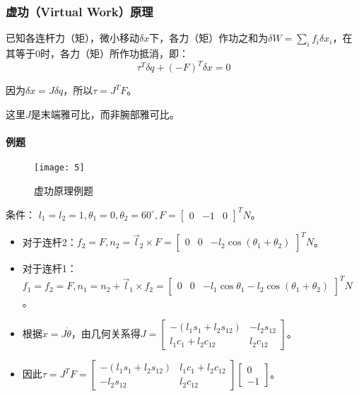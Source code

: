 \documentclass[
12pt, %
a4paper, 
oneside, %
headinclude,footinclude, %
]{scrartcl}
\begin{document}
\subsubsection{虚功（Virtual Work）原理}
已知各连杆力（矩），微小移动$ \delta x $下，各力（矩）作功之和为$ \delta W = \sum_i f_i \delta x_i $，在其等于$ 0 $时，各力（矩）所作功抵消，即：
$$ \tau^T \delta q + (-F)^T \delta x = 0 $$

因为$ \delta x = J \delta q $，所以$ \tau = J^T F $。

这里$ J $是末端雅可比，而非腕部雅可比。
\paragraph{例题}
\begin{figure}[H]
\centering 
\texttt{[image: 5]} 
\caption[虚功原理例题]{虚功原理例题}
\end{figure}

条件： $ l_1 = l_2 = 1, \theta_1 = 0, \theta_2 = 60^\circ, F = \begin{bmatrix} 0 & -1 & 0 \end{bmatrix}^T N $。
\begin{itemize}
\item 对于连杆2：$ f_2 = F, n_2 = \vec{l}_2 \times F = \begin{bmatrix} 0 & 0 & -l_2 \cos(\theta_1 + \theta_2) \end{bmatrix}^T N $。
\item 对于连杆1：$ f_1 = f_2 = F, n_1 = n_2 + \vec{l}_1 \times f_2 = \begin{bmatrix} 0 & 0 & -l_1 \cos\theta_1 - l_2 \cos(\theta_1 + \theta_2) \end{bmatrix}^T N $。
\item 根据$ \dot{x} = J \dot{\theta} $，由几何关系得$ J = \begin{bmatrix} -(l_1 s_1 + l_2 s_{12}) & -l_2 s_{12} \\ l_1 c_1 + l_2 c_{12} & l_2 c_{12} \end{bmatrix} $。
\item 因此$ \tau = J^T F = \begin{bmatrix} -(l_1 s_1 + l_2 s_{12}) & l_1 c_1 + l_2 c_{12} \\ - l_2 s_{12} & l_2 c_{12} \end{bmatrix} \begin{bmatrix} 0 \\ -1 \end{bmatrix} $。
\end{itemize}
\end{document}
